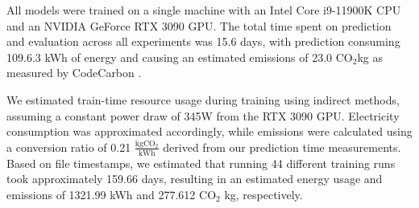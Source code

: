 \documentclass{article}
\newcommand{\cotwo}{\ensuremath{\mathrm{CO_2}}}
\begin{document}


All models were trained on a single machine with an Intel Core i9-11900K CPU and an NVIDIA GeForce RTX 3090
  GPU.
The total time spent on prediction and evaluation across all experiments was 15.6 days, with prediction
  consuming 109.6.3 kWh of energy and causing an estimated emissions of 23.0 \cotwo kg as measured by
  CodeCarbon \cite{lacoste2019codecarbon}.

We estimated train-time resource usage during training using indirect methods, assuming a constant power
  draw of 345W from the RTX 3090 GPU.
Electricity consumption was approximated accordingly, while emissions were calculated using a conversion
  ratio of 0.21 $\frac{\textrm{kg}\cotwo{}}{\textrm{kWh}}$ derived from our prediction time measurements.
Based on file timestamps, we estimated that running 44 different training runs took approximately 159.66
  days, resulting in an estimated energy usage and emissions of 1321.99 kWh and 277.612 $\cotwo$ kg,
  respectively.
\end{document}
